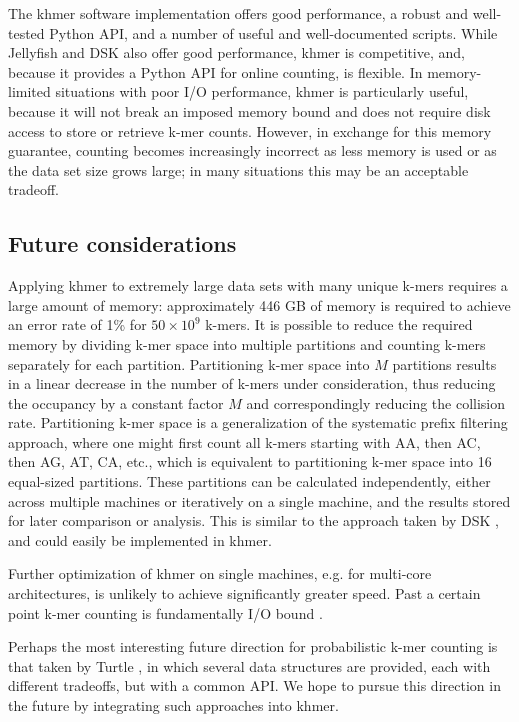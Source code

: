 \documentclass[10pt]{article}
\begin{document}
The khmer software implementation offers good performance, a robust
and well-tested Python API, and a number of useful and well-documented
scripts.  While Jellyfish and DSK also offer good performance,
khmer is competitive, and, because it provides a
Python API for online counting, is flexible.  In memory-limited
situations with poor I/O performance, khmer is particularly useful,
because it will not break an imposed memory bound and does not require
disk access to store or retrieve k-mer counts.  However, in exchange
for this memory guarantee, counting becomes increasingly incorrect as
less memory is used or as the data set size grows large; in many
situations this may be an acceptable tradeoff.

\subsection*{Future considerations}

Applying khmer to extremely large data sets with many unique k-mers
requires a large amount of memory: approximately 446 GB of memory is
required to achieve an error rate of 1\% for
$50\times 10^9$ k-mers. It is possible to reduce the required memory by dividing
k-mer space into multiple partitions and counting k-mers separately
for each partition. Partitioning k-mer space into $M$ partitions
results in a linear decrease in the number of k-mers under
consideration, thus reducing the occupancy by a constant factor $M$
and correspondingly reducing the collision rate.  Partitioning k-mer
space is a generalization of the systematic prefix filtering approach,
where one might first count all k-mers starting with AA, then AC, then
AG, AT, CA, etc., which is equivalent to partitioning k-mer space into
16 equal-sized partitions. These partitions can be calculated
independently, either across multiple machines or iteratively on a
single machine, and the results stored for later comparison or
analysis.  This is similar to the approach taken by DSK
\cite{Rizk2013}, and could easily be implemented in khmer.

Further optimization of khmer on single machines, e.g. for multi-core
architectures, is unlikely to achieve significantly greater speed.
Past a certain point k-mer counting is fundamentally I/O bound
\cite{McDonald2013}.

Perhaps the most interesting future direction for probabilistic k-mer
counting is that taken by Turtle \cite{Roy2013}, in which several
data structures are provided, each with different tradeoffs, but with
a common API.  We hope to pursue this direction in the future by
integrating such approaches into khmer.
\end{document}
